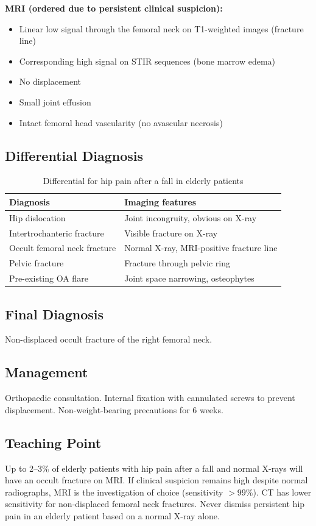 \textbf{MRI (ordered due to persistent clinical suspicion):}
\begin{itemize}
    \item Linear low signal through the femoral neck on T1-weighted images (fracture line)
    \item Corresponding high signal on STIR sequences (bone marrow edema)
    \item No displacement
    \item Small joint effusion
    \item Intact femoral head vascularity (no avascular necrosis)
\end{itemize}

\subsection{Differential Diagnosis}
\begin{table}[h]
\centering
\caption{Differential for hip pain after a fall in elderly patients}
\begin{tabular}{|p{}|p{}|}
\hline
\textbf{Diagnosis} & \textbf{Imaging features} \\
\hline
Hip dislocation & Joint incongruity, obvious on X-ray \\
\hline
Intertrochanteric fracture & Visible fracture on X-ray \\
\hline
Occult femoral neck fracture & Normal X-ray, MRI-positive fracture line \\
\hline
Pelvic fracture & Fracture through pelvic ring \\
\hline
Pre-existing OA flare & Joint space narrowing, osteophytes \\
\hline
\end{tabular}
\end{table}

\subsection{Final Diagnosis}
Non-displaced occult fracture of the right femoral neck.

\subsection{Management}
Orthopaedic consultation. Internal fixation with cannulated screws to prevent displacement. Non-weight-bearing precautions for 6 weeks.

\subsection{Teaching Point}
Up to 2--3\% of elderly patients with hip pain after a fall and normal X-rays will have an occult fracture on MRI. If clinical suspicion remains high despite normal radiographs, MRI is the investigation of choice (sensitivity $>99\%$). CT has lower sensitivity for non-displaced femoral neck fractures. Never dismiss persistent hip pain in an elderly patient based on a normal X-ray alone.

\clearpage
